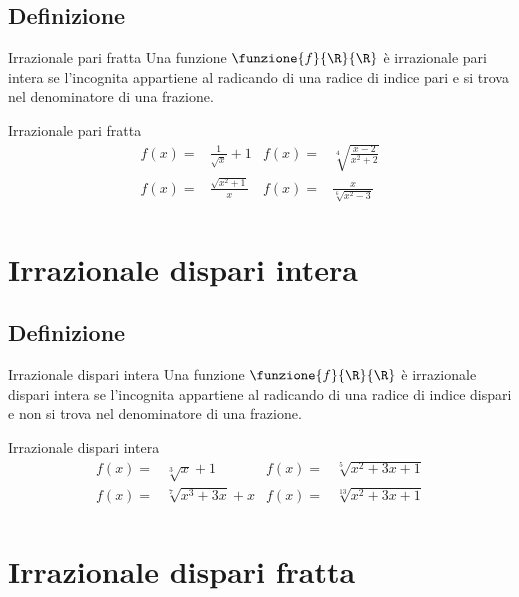 \subsection{Definizione}
\begin{definizionet}{Irrazionale pari fratta}{}
	Una funzione $\funzione{f}{\R}{\R}$ è irrazionale pari intera se l'incognita appartiene al radicando di una radice di indice pari e   si trova nel denominatore di una frazione. 
\end{definizionet}
\begin{esempiot}{Irrazionale pari fratta}{}
	\begin{align*}
	f(x)=&\frac{1}{\sqrt{x}}+1&f(x)=&\sqrt[4]{\frac{x-2}{x^2+2}}\\
	f(x)=&\frac{\sqrt{x^2+1}}{x}&f(x)=&\frac{x}{\sqrt[6]{x^2-3}}\\
	\end{align*}
\end{esempiot}
\section{Irrazionale dispari intera}
\subsection{Definizione}
\begin{definizionet}{Irrazionale dispari intera}{}
	Una funzione $\funzione{f}{\R}{\R}$ è irrazionale dispari intera se l'incognita appartiene al radicando di una radice di indice dispari e  non si trova nel denominatore di una frazione. 
\end{definizionet}
\begin{esempiot}{Irrazionale dispari intera}{}
	\begin{align*}
	f(x)=&\sqrt[3]{x}+1&f(x)=&\sqrt[5]{x^2+3x+1}\\
	f(x)=&\sqrt[7]{x^3+3x}+x&f(x)=&\sqrt[13]{x^2+3x+1}\\
	\end{align*}
\end{esempiot}
\section{Irrazionale dispari fratta}
